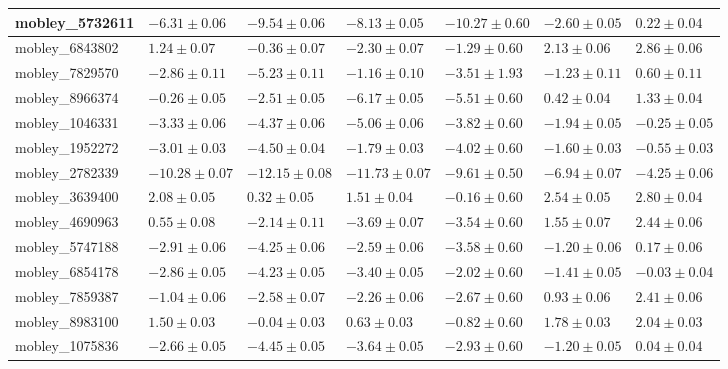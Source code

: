 \documentclass{article}
\begin{document}
\begin{landscape}
\begin{longtable}{|l{3.0cm}|l{3.0cm}|l{3.2cm}|l{3.6cm}|l{3.0cm}|l{3.0cm}|l{3.0cm}|}
mobley\_5732611	&	$	-6.31	\pm	0.06	$	&	$	-9.54	\pm	0.06	$	&	$	-8.13	\pm	0.05	$	&	$	-10.27	\pm	0.60	$	&	$	-2.60	\pm	0.05	$	&	$	0.22	\pm	0.04	$	\\ \hline
mobley\_6843802	&	$	1.24	\pm	0.07	$	&	$	-0.36	\pm	0.07	$	&	$	-2.30	\pm	0.07	$	&	$	-1.29	\pm	0.60	$	&	$	2.13	\pm	0.06	$	&	$	2.86	\pm	0.06	$	\\ \hline
mobley\_7829570	&	$	-2.86	\pm	0.11	$	&	$	-5.23	\pm	0.11	$	&	$	-1.16	\pm	0.10	$	&	$	-3.51	\pm	1.93	$	&	$	-1.23	\pm	0.11	$	&	$	0.60	\pm	0.11	$	\\ \hline
mobley\_8966374	&	$	-0.26	\pm	0.05	$	&	$	-2.51	\pm	0.05	$	&	$	-6.17	\pm	0.05	$	&	$	-5.51	\pm	0.60	$	&	$	0.42	\pm	0.04	$	&	$	1.33	\pm	0.04	$	\\ \hline
mobley\_1046331	&	$	-3.33	\pm	0.06	$	&	$	-4.37	\pm	0.06	$	&	$	-5.06	\pm	0.06	$	&	$	-3.82	\pm	0.60	$	&	$	-1.94	\pm	0.05	$	&	$	-0.25	\pm	0.05	$	\\ \hline
mobley\_1952272	&	$	-3.01	\pm	0.03	$	&	$	-4.50	\pm	0.04	$	&	$	-1.79	\pm	0.03	$	&	$	-4.02	\pm	0.60	$	&	$	-1.60	\pm	0.03	$	&	$	-0.55	\pm	0.03	$	\\ \hline
mobley\_2782339	&	$	-10.28	\pm	0.07	$	&	$	-12.15	\pm	0.08	$	&	$	-11.73	\pm	0.07	$	&	$	-9.61	\pm	0.50	$	&	$	-6.94	\pm	0.07	$	&	$	-4.25	\pm	0.06	$	\\ \hline
mobley\_3639400	&	$	2.08	\pm	0.05	$	&	$	0.32	\pm	0.05	$	&	$	1.51	\pm	0.04	$	&	$	-0.16	\pm	0.60	$	&	$	2.54	\pm	0.05	$	&	$	2.80	\pm	0.04	$	\\ \hline
mobley\_4690963	&	$	0.55	\pm	0.08	$	&	$	-2.14	\pm	0.11	$	&	$	-3.69	\pm	0.07	$	&	$	-3.54	\pm	0.60	$	&	$	1.55	\pm	0.07	$	&	$	2.44	\pm	0.06	$	\\ \hline
mobley\_5747188	&	$	-2.91	\pm	0.06	$	&	$	-4.25	\pm	0.06	$	&	$	-2.59	\pm	0.06	$	&	$	-3.58	\pm	0.60	$	&	$	-1.20	\pm	0.06	$	&	$	0.17	\pm	0.06	$	\\ \hline
mobley\_6854178	&	$	-2.86	\pm	0.05	$	&	$	-4.23	\pm	0.05	$	&	$	-3.40	\pm	0.05	$	&	$	-2.02	\pm	0.60	$	&	$	-1.41	\pm	0.05	$	&	$	-0.03	\pm	0.04	$	\\ \hline
mobley\_7859387	&	$	-1.04	\pm	0.06	$	&	$	-2.58	\pm	0.07	$	&	$	-2.26	\pm	0.06	$	&	$	-2.67	\pm	0.60	$	&	$	0.93	\pm	0.06	$	&	$	2.41	\pm	0.06	$	\\ \hline
mobley\_8983100	&	$	1.50	\pm	0.03	$	&	$	-0.04	\pm	0.03	$	&	$	0.63	\pm	0.03	$	&	$	-0.82	\pm	0.60	$	&	$	1.78	\pm	0.03	$	&	$	2.04	\pm	0.03	$	\\ \hline
mobley\_1075836	&	$	-2.66	\pm	0.05	$	&	$	-4.45	\pm	0.05	$	&	$	-3.64	\pm	0.05	$	&	$	-2.93	\pm	0.60	$	&	$	-1.20	\pm	0.05	$	&	$	0.04	\pm	0.04	$	\\ \hline

\end{longtable}
\end{landscape}
\end{document}
